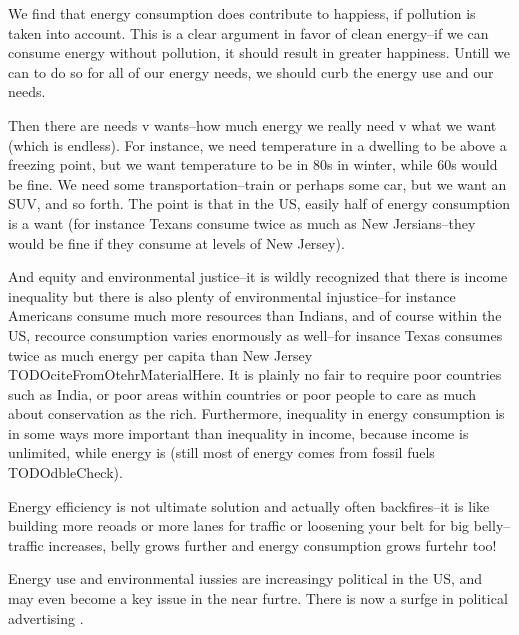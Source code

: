 \documentclass[10pt, letterpaper]{article}
\begin{document}
\begin{spacing}{1.4}
We find that energy consumption does contribute to happiess, if pollution is
taken into account. This is a clear argument in favor of clean energy--if we can
consume energy without pollution, it should result in greater happiness. Untill
we can to do so for all of our energy needs, we should curb the energy use and
our needs.

Then there are needs v wants--how much energy we really need v what we want
(which is endless). For instance, we need temperature in a dwelling to be above
a freezing point, but we want temperature to be in 80s in winter, while 60s
would be fine. We need some transportation--train or perhaps some car, but we
want an SUV, and so forth. The point is that in the US, easily half of energy
consumption is a want (for instance Texans consume twice as much as New
Jersians--they would be fine if they consume at levels of New Jersey).%

 And equity and environmental justice--it is wildly
recognized that there is income inequality \citep[e.g.,]{piketty14} but there is
 also plenty of environmental injustice--for instance Americans consume much
 more resources than Indians, and of course within the US, recource consumption
 varies enormously as well--for insance Texas consumes twice as much energy per
 capita than New Jersey TODOciteFromOtehrMaterialHere. It is plainly no fair to
 require poor countries such as India, or poor areas within countries or poor
 people to care as much about conservation as the rich.
 Furthermore, inequality in energy
 consumption is in some ways more important than inequality in income, because
 income is unlimited, while energy is (still most of energy comes from fossil
 fuels TODOdbleCheck).  %


Energy efficiency is not ultimate solution and actually often backfires--it is
like building more reoads or more lanes for traffic or loosening your belt for
big belly--traffic increases, belly grows further and energy consumption grows
furtehr too!

Energy use and environmental iussies are  increasingy political in the US, and
may even become a key issue in the near furtre. There is now a surfge in
political advertising \citep{davenport_nyt_oct21_14}.



\end{spacing}
\end{document}
